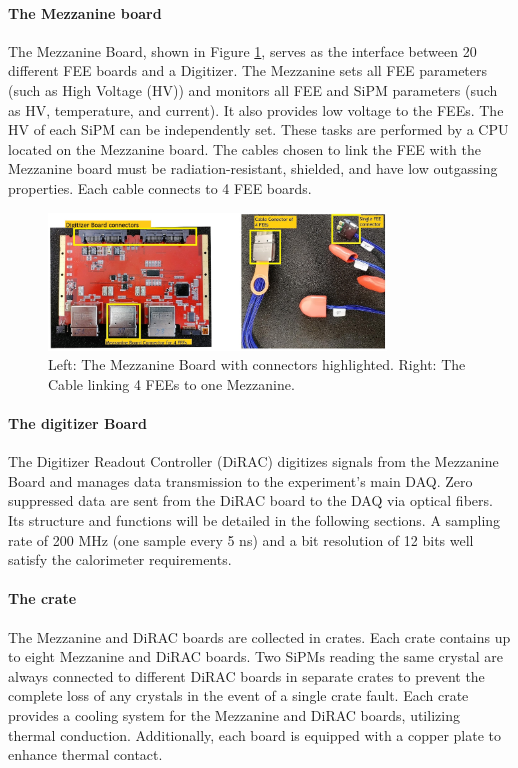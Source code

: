 \paragraph{The Mezzanine board}
The Mezzanine Board, shown in Figure \ref{fig:mezzanine}, 
serves as the interface between 20 different FEE boards and a Digitizer. 
The Mezzanine sets all FEE parameters (such as High Voltage (HV)) and 
monitors all FEE and SiPM parameters (such as HV, temperature, and current). 
It also provides low voltage to the FEEs. 
The HV of each SiPM can be independently set. 
These tasks are performed by a CPU located on the Mezzanine board. 
The cables chosen to link the FEE with the Mezzanine board must be radiation-resistant, 
shielded, and have low outgassing properties. Each cable connects to 4 FEE boards.
\begin{figure}[!h]
    \centering
    \includegraphics[width =0.8\textwidth]{figures/png/Screenshot_20240706_144234.png}
    \caption{Left: The Mezzanine Board with connectors highlighted. 
    Right: The Cable linking 4 FEEs to one Mezzanine.}
    \label{fig:mezzanine}
\end{figure}



\paragraph{The digitizer Board}
The Digitizer Readout Controller (DiRAC) 
digitizes signals from the Mezzanine Board and 
manages data transmission to the experiment's main DAQ. 
Zero suppressed data are sent from the DiRAC board to the DAQ via optical fibers. 
Its structure and functions will be detailed in the following sections. 
A sampling rate of 200 MHz (one sample every 5 ns) and a bit resolution of 12 bits well
satisfy the calorimeter requirements. 

\paragraph{The crate}
The Mezzanine and DiRAC boards are collected in crates. Each crate contains up to 
eight Mezzanine and DiRAC boards. Two SiPMs reading the same crystal are 
always connected to different DiRAC boards in separate crates to prevent 
the complete loss of any crystals in the event of a single crate fault. 
Each crate provides a cooling system for the Mezzanine and DiRAC boards, 
utilizing thermal conduction. Additionally, each board is equipped with a 
copper plate to enhance thermal contact.

